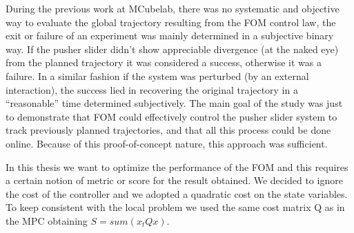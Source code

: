 \documentclass{article}
\begin{document}
During the previous work at MCubelab, there was no systematic and objective way to evaluate the global trajectory resulting from the FOM control law, the exit or failure of an experiment was mainly determined in a subjective binary way. If the pusher slider didn’t show appreciable divergence (at the naked eye) from the planned trajectory it was considered a success, otherwise it was a failure. In a similar fashion if the system was perturbed (by an external interaction), the success lied in recovering the original trajectory in a “reasonable” time determined subjectively. The main goal of the study was just to demonstrate that FOM could effectively control the pusher slider system to track previously planned trajectories, and that all this process could be done online. Because of this proof-of-concept nature, this approach was sufficient.

In this thesis we want to optimize the performance of the FOM and this requires a certain notion of metric or score for the result obtained. We decided to ignore the cost of the controller and we adopted a quadratic cost on the state variables. To keep consistent with the local problem we used the same cost matrix Q as in the MPC obtaining $S = sum(x_t Q x)$.
\end{document}
